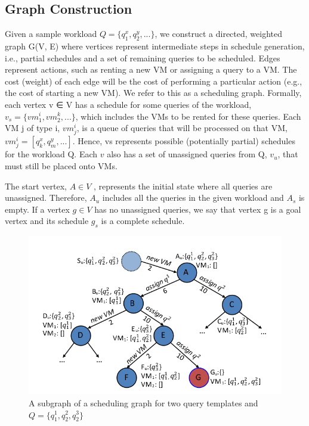 \subsection{Graph Construction}
Given a sample workload \(Q = \{q^x_1 , q^y_2 , ...\}\), we construct a directed, weighted graph G(V, E) where vertices represent intermediate steps in schedule generation, i.e., partial schedules and a set of remaining queries to be scheduled. Edges represent actions, such as renting a new VM or assigning a query to a VM. The cost (weight) of each edge will be the cost of performing a particular action (e.g., the cost of starting a new VM). We refer to this as a scheduling graph. Formally, each vertex v ∈ V has a schedule for some queries of the workload, \(v_s = \{vm^i_1, vm^k_2, ...\}\), which includes the VMs to be rented for these queries. Each VM j of type i, \(vm^i_j\), is a queue of queries that will be processed on that VM, \(vm^i_j = [q^x_k , q^y_m, ...]\). Hence, vs represents possible (potentially partial) schedules for the workload Q. Each \(v\) also has a set of unassigned queries from Q, \(v_u\), that must still be placed onto VMs. 

The start vertex, \(A \in V\) , represents the initial state where all queries are unassigned. Therefore, \(A_u\) includes all the queries in the given workload and \(A_s\) is empty. If a vertex \(g \in V\) has no unassigned queries, we say that vertex g is a goal vertex and its schedule \(g_s\) is a complete schedule.
\begin{figure}
\centering
\includegraphics[width=1.0\textwidth]{scheduling_graph.png}
\caption{\label{fig:scheduling_graph}A subgraph of a scheduling graph for two query templates and \(Q = \{q^1_1, q^2_2, q^3_2\}\)}
\end{figure}

